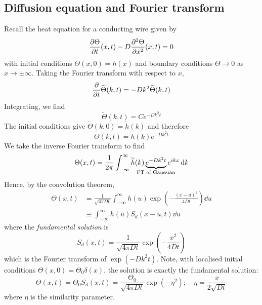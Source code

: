 \documentclass[a4paper]{article}
\begin{document}
\subsection{Diffusion equation and Fourier transform}
Recall the heat equation for a conducting wire given by
\[
	\pdv{\Theta}{t}\qty(x,t) - D\pdv[2]{\Theta}{x}\qty(x,t) = 0
\]
with initial conditions \( \Theta(x,0) = h(x) \) and boundary conditions \( \Theta \to 0 \) as \( x \to \pm \infty \).
Taking the Fourier transform with respect to \( x \),
\[
	\pdv{t} \widetilde \Theta(k,t) = -D k^2 \widetilde \Theta(k,t)
\]
Integrating, we find
\[
	\widetilde \Theta(k,t) = C e^{-D k^2 t}
\]
The initial conditions give \( \widetilde \Theta(k,0) = \widetilde h(k) \) and therefore
\[
	\widetilde \Theta(k,t) = \widetilde h(k) e^{-Dk^2 t}
\]
We take the inverse Fourier transform to find
\[
	\Theta(x,t) = \frac{1}{2\pi} \int_{-\infty}^\infty \widetilde h(k) \underbrace{e^{-Dk^2 t}}_{\mathclap{\text{FT of Gaussian}}} e^{ikx} \dd{k}
\]
Hence, by the convolution theorem,
\begin{align*}
	\Theta(x,t) & = \frac{1}{\sqrt{4 \pi D t}} \int_{-\infty}^\infty h(u) \exp(-\frac{(x-u)^2}{4Dt}) \dd{u} \\
	            & \equiv \int_{-\infty}^\infty h(u) S_d(x-u,t) \dd{u}
\end{align*}
where the \textit{fundamental solution} is
\[
	S_d(x,t) = \frac{1}{\sqrt{4 \pi D t}} \exp(-\frac{x^2}{4Dt})
\]
which is the Fourier transform of \( \exp(-D k^2 t) \).
Note, with localised initial conditions \( \Theta(x,0) = \Theta_0 \delta(x) \), the solution is exactly the fundamental solution:
\[
	\Theta(x,t) = \Theta_0 S_d(x,t) = \frac{\Theta_0}{\sqrt{4 \pi D t}} \exp(-\eta^2);\quad \eta = \frac{x}{2\sqrt{Dt}}
\]
where \( \eta \) is the similarity parameter.
\end{document}

